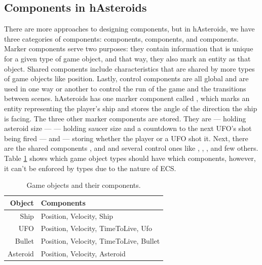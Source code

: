 \documentclass[
  digital, %
  color,   %
  table,   %
  oneside, %
  lof,     %
  lot,     %
]{fithesis3}
\begin{document}
\subsection{Components in hAsteroids}
There are more approaches to designing components, but in hAsteroids,
we have three categories of components:  components,
 components, and  components. Marker components serve two purposes:
they contain information that is unique for a given type of game object,
and that way, they also mark an entity as that object.
Shared components include characteristics that are shared by more types
of game objects like position. Lastly, control components are all global
and are used in one way or another to control the run of the game and the transitions between scenes.
hAsteroids has one  marker component called ,
which marks an entity representing the player's ship and stores
the angle of the direction the ship is facing. The three other marker
components are  stored. They are  — holding
asteroid size —  — holding saucer size and a countdown
to the next UFO's shot being fired — and  — storing whether
the player or a UFO shot it. Next, there are the shared components
,  and 
and several  control ones like ,
, ,  and few others.
Table \ref{tab:entities} shows which game object types should have which components,
however, it can't be enforced by types due to the nature of ECS.

\begin{table}[hbt]
  \begin{tabularx}{\textwidth}{|r|X|}
    \toprule
    Object & Components \\
    \midrule
    Ship     & {Position}, {Velocity}, {Ship} \\
    UFO      & {Position}, {Velocity}, {TimeToLive}, {Ufo} \\
    Bullet   & {Position}, {Velocity}, {TimeToLive}, {Bullet} \\
    Asteroid & {Position}, {Velocity}, {Asteroid} \\
    \bottomrule
  \end{tabularx}
  \caption{Game objects and their components.}
  \label{tab:entities}
\end{table}
\end{document}
